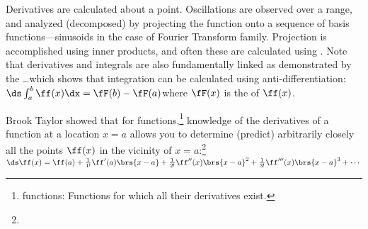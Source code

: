 Derivatives are calculated  about a point.
Oscillations are observed  over a range,
and analyzed (decomposed) by projecting the function onto a sequence of basis functions---sinusoids 
in the case of Fourier Transform family.
Projection is accomplished using inner products, and often these are calculated using .
Note that derivatives and integrals are also fundamentally linked as demonstrated by the
\ldots which shows that integration 
can be calculated using anti-differentiation:
\\\indentx$\ds\int_a^b \ff(x)\dx = \fF(b) - \fF(a)$\qquad where $\fF(x)$ is the  of $\ff(x)$.


Brook Taylor showed that for  functions,\footnote{
   functions: Functions for which all their derivatives exist.}
knowledge of the derivatives of a function at a location $x=a$
allows you to determine (predict) arbitrarily closely all the points $\ff(x)$ in the vicinity of $x=a$:\footnote{
}
\\\indentx$\ds\ff(x) = \ff(a) + \frac{1}{1!}\ff'  (a)\brs{x-a}
                              + \frac{1}{2!}\ff'' (x)\brs{x-a}^2
                              + \frac{1}{3!}\ff'''(x)\brs{x-a}^3
                              + \cdots
                  $

